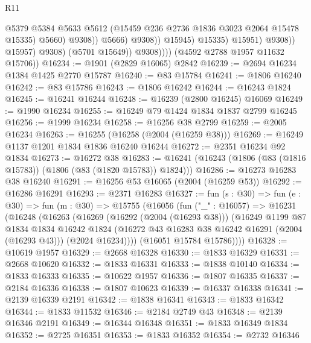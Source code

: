 \begin{lexlean}{R11}
\begin{coremodule}
                                          @5379
                                          @5384
                                          @5633
                                          @5612
                                          (@15459 @236 @2736 @1836 @3023 @2064 @15478 @15335)
                                          @5660)
                                        @9308))
                                    @5666)
                                  @9308))
                              @15945)
                            @15335)
                          @15951)
                        @9308))
                    @15957)
                  @9308)
                (@5701 @15649))
              @9308))))
      (@4592 @2788 @1957 @11632 @15706))
@16234 := @1901 (@2829 @16065) @2842
@16239 := @2694 @16234 @1384 @1425 @2770 @15787
@16240 := @83 @15784
@16241 := @1806 @16240
@16242 := @83 @15786
@16243 := @1806 @16242
@16244 := @16243 @1824
@16245 := @16241 @16244
@16248 := @16239 (@2800 @16245) @16069
@16249 := @1990 @16234
@16255 := @16249 @79 @1424 @1834 @1837 @2799 @16245
@16256 := @1999 @16234
@16258 := @16256 @38 @2799
@16259 := @2005 @16234
@16263 := @16255 (@16258 (@2004 (@16259 @38)))
@16269 := @16249 @1137 @1201 @1834 @1836 @16240 @16244
@16272 := @2351 @16234 @92 @1834
@16273 := @16272 @38
@16283 := @16241 (@16243 (@1806 (@83 (@1816 @15783)) (@1806 (@83 (@1820 @15783)) @1824)))
@16286 := @16273 @16283 @38 @16240
@16291 := @16256 @53 @16065 (@2004 (@16259 @53))
@16292 := @16286 @16291
@16293 := @2371 @16283
@16327 := fun (s : @30) =>
  fun (e : @30) =>
  fun (m : @30) =>
  @15755
    (@16056
      (fun ("_" : @16057) =>
      @16231
        (@16248
          (@16263
            (@16269
              (@16292 (@2004 (@16293 @38)))
              (@16249
                @1199
                @87
                @1834
                @1834
                @16242
                @1824
                (@16272 @43 @16283 @38 @16242 @16291 (@2004 (@16293 @43)))
                (@2024 @16234))))
          (@16051 @15784 @15786))))
@16328 := @10619 @1957
@16329 := @2668 @16328
@16330 := @1833 @16329
@16331 := @2668 @10620
@16332 := @1833 @16331
@16333 := @1838 @10140
@16334 := @1833 @16333
@16335 := @10622 @1957
@16336 := @1807 @16335
@16337 := @2184 @16336
@16338 := @1807 @10623
@16339 := @16337 @16338
@16341 := @2139 @16339 @2191
@16342 := @1838 @16341
@16343 := @1833 @16342
@16344 := @1833 @11532
@16346 := @2184 @2749 @43
@16348 := @2139 @16346 @2191
@16349 := @16344 @16348
@16351 := @1833 @16349 @1834
@16352 := @2725 @16351
@16353 := @1833 @16352
@16354 := @2732 @16346

\end{coremodule}
\end{lexlean}
